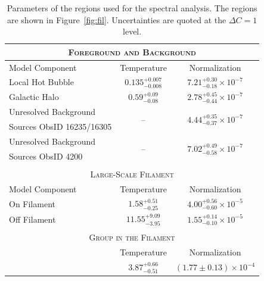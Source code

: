 \begin{table}
  \caption{Parameters of the regions used for the spectral analysis. The regions are shown in Figure~\ref{fig:fil}. Uncertainties are quoted at the $\Delta C = 1$ level. \label{tab:spectra}}
  \begin{center}
    \begin{threeparttable}
      \begin{tabular}{l c c}
              \multicolumn{3}{c}{\textsc{Foreground and Background}} \\
              \hline\hline
              Model Component & Temperature\tnote{a} & Normalization\tnote{b} \\
              \hline
              Local Hot Bubble & $0.135_{-0.008}^{+0.007}$ & $7.21_{-0.18}^{+0.30} \times 10^{-7}$ \\
              Galactic Halo & $0.59_{-0.08}^{+0.09}$ & $2.78_{-0.44}^{+0.45} \times 10^{-7}$ \\
              Unresolved Background       &\multirow{2}{*}{ -- } & \multirow{2}{*}{ $4.44_{-0.37}^{+0.35} \times 10^{-7}$} \\
              Sources ObsID 16235/16305 &                                    &            \\
              Unresolved Background       &\multirow{2}{*}{ -- } & \multirow{2}{*}{ $7.02_{-0.58}^{+0.49} \times 10^{-7}$} \\
              Sources ObsID 4200               &                                    &            \\
              \multicolumn{3}{c}{} \\
              \multicolumn{3}{c}{\textsc{Large-Scale Filament}} \\
              \hline\hline
                Model Component & Temperature\tnote{a} & Normalization\tnote{b} \\
              \hline
               On Filament & $1.58_{-0.25}^{+0.51}$ & $4.00_{-0.60}^{+0.56} \times 10^{-5}$ \\
               Off Filament & $11.55_{-3.95}^{+9.09}$ & $1.55_{-0.10}^{+0.14} \times 10^{-5}$  \\
               \multicolumn{3}{c}{} \\
              \multicolumn{3}{c}{\textsc{Group in the Filament}} \\
              \hline\hline
                             & Temperature\tnote{a} & Normalization\tnote{b} \\
              \hline
                            & $3.87_{-0.51}^{+0.66}$ & $ ( 1.77\pm 0.13 ) \times 10^{-4}$ \\

\end{tabular}
\end{threeparttable}
\end{center}
\end{table}
